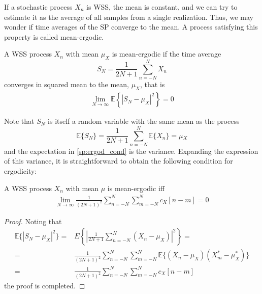 If a stochastic process $X_n$ is WSS, the mean is constant, and we can try to estimate it as the average of all samples from a single realization. Thus, we may wonder if time averages of the SP converge to the mean. A process satisfying this property is called mean-ergodic.

\begin{definition}

A WSS process $X_n$ with mean $\mu_X$ is mean-ergodic if the time average
\begin{equation}
  S_N = \frac{1}{2N + 1} \sum_{n=-N}^N X_n
\end{equation}
converges in squared mean to the mean, $\mu_X$, that is
\begin{align}
\lim_{N \rightarrow \infty} \mathbb{E}\left\{\left| S_N - \mu_X \right|^2\right\} = 0
\label{sp:ergod_cond}
\end{align}

\end{definition}

Note that $S_N$ is itself a random variable with the same mean as the process
\begin{equation}
  \mathbb{E}\{S_N\} = \frac{1}{2N+1} \sum_{n=-N}^N \mathbb{E}\{X_n\} = \mu{}_X
\end{equation}
and the expectation in \eqref{sp:ergod_cond} is the variance. Expanding the expression of this variance, it is straightforward to obtain the following condition for ergodicity:

\begin{theorem}

A WSS process $X_n$ with mean $\mu$ is mean-ergodic iff
\begin{align}
\lim_{N \rightarrow \infty} \frac{1}{(2N+1)^2} \sum_{n=-N}^N\sum_{m=-N}^N  c_X[n-m] = 0
\label{AverageVar0}
\end{align}

\end{theorem}

\begin{proof}

Noting that
\begin{align}
\mathbb{E}\{|S_N - \mu_X|^2\} 
    =& E\left\{\left| \frac{1}{2N+1} \sum_{n=-N}^N (X_n - \mu_X) \right|^2 \right\} =                \nonumber\\
    =& \frac{1}{(2N+1)^2} \sum_{n=-N}^N \sum_{m=-N}^N \mathbb{E}\{(X_n - \mu_X)(X_m^* - \mu_X^*) \}  \nonumber\\
    =& \frac{1}{(2N+1)^2} \sum_{n=-N}^N\sum_{m=-N}^N  c_X[n-m]
\label{AverageVar1}
\end{align}
the proof is completed.
\end{proof}

